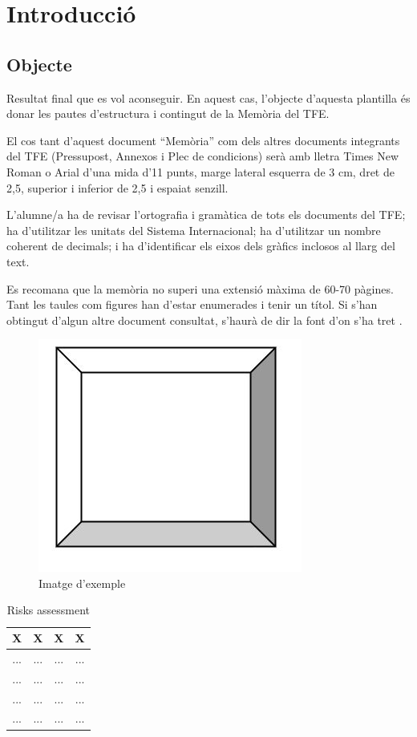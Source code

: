 \chapter{Introducció}

\section{Objecte}


Resultat final que es vol aconseguir. En aquest cas, l’objecte d’aquesta plantilla és donar les pautes d’estructura i contingut de la Memòria del TFE. 

El cos tant d’aquest document “Memòria” com dels altres documents integrants del TFE  (Pressupost, Annexos i Plec de condicions) serà amb lletra Times New Roman o Arial d’una mida d’11 punts, marge lateral esquerra de 3 cm, dret de 2,5, superior i inferior de 2,5 i espaiat senzill.

L’alumne/a ha de revisar l’ortografia i gramàtica de tots els documents del TFE; ha d’utilitzar les unitats del Sistema Internacional; ha d’utilitzar un nombre coherent de decimals; i ha d’identificar els eixos dels gràfics inclosos al llarg del text.

Es recomana que la memòria no superi una extensió màxima de 60-70 pàgines. 
Tant les taules com figures han d’estar enumerades i tenir un títol. Si s’han obtingut d’algun altre document consultat, s’haurà de dir la font d’on s’ha tret \cite{eseiaat}.  


\begin{figure}[H]
    \centering
    \includegraphics[width=0.3
\linewidth]{Figures/IMATGE_EXEMPLE.jpg}
    \caption{Imatge d'exemple}
    \label{fig:Imatge d'exemple}
\end{figure}


\begin{table}[H]

  \centering
   \caption{Risks assessment} 
   
  \begin{tabular}{|c|c|c|c|}
    \hline
    \textbf{X} & \textbf{X} & \textbf{X} & \textbf{X} \\
    \hline
    ... & ... & ... & ...\\ \hline
    ... & ... & ... & ...\\ \hline
    ... & ... & ... & ...\\ \hline
    ... & ... & ... & ...\\ \hline
    
  \end{tabular}
  \label{tasks}
 
\end{table}


